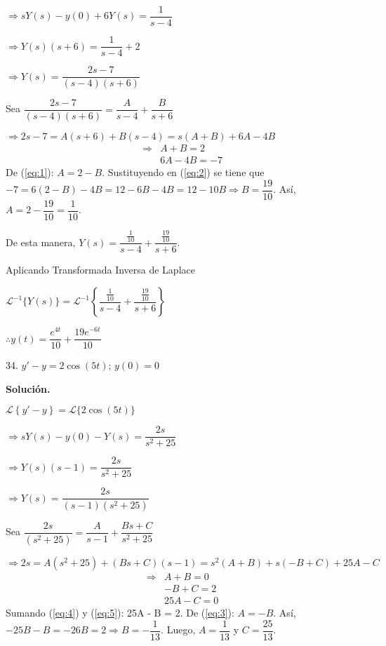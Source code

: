 \documentclass[fleqn]{article}
\begin{document}
    $ \Longrightarrow s Y(s) - y(0) + 6Y(s) = \dfrac{1}{s - 4} $

    $ \Longrightarrow Y(s)(s + 6) = \dfrac{1}{s - 4} + 2 $

    $ \Longrightarrow Y(s) = \dfrac{2s - 7}{(s - 4)(s + 6)} $

    Sea $ \dfrac{2s - 7}{(s - 4)(s + 6)} = \dfrac{A}{s - 4} + \dfrac{B}{s + 6} $

    $ \Longrightarrow 2s - 7 = A(s+6) + B(s-4) = s(A + B) + 6A - 4B $
    \begin{align}
        \Longrightarrow &A + B = 2 \label{eq:1} \\
        &6A - 4B = -7 \label{eq:2}
    \end{align}
    De (\ref{eq:1}): $ A = 2 - B $. Sustituyendo en (\ref{eq:2}) se tiene que $ -7 = 6(2 - B) - 4B = 12 - 6B - 4B = 12 - 10B \Longrightarrow B = \dfrac{19}{10} $. Así, $ A = 2 - \dfrac{19}{10} = \dfrac{1}{10} $.

    De esta manera, $ Y(s) = \dfrac{\frac{1}{10}}{s - 4} + \dfrac{\frac{19}{10}}{s + 6} $.

    Aplicando Transformada Inversa de Laplace

    $ \mathscr{L}^{-1} \lbrace Y(s) \rbrace = \mathscr{L}^{-1} \left\lbrace \dfrac{\frac{1}{10}}{s - 4} + \dfrac{\frac{19}{10}}{s + 6} \right\rbrace $ 

    $ \therefore y(t) = \dfrac{e^{4t}}{10} + \dfrac{19 e^{-6t}}{10} $

    34. $ y' - y = 2 \cos (5t) $; $ y(0) = 0 $
    
    \textbf{Solución.}

    $ \mathscr{L} \left\lbrace y' - y \right\rbrace = \mathscr{L} \lbrace 2 \cos (5t) \rbrace $

    $ \Longrightarrow s Y(s) - y(0) - Y(s) = \dfrac{2s}{s^2 + 25} $

    $ \Longrightarrow Y(s)(s - 1) = \dfrac{2s}{s^2 + 25} $

    $ \Longrightarrow Y(s) = \dfrac{2s}{(s - 1)(s^2 + 25)} $

    Sea $ \dfrac{2s}{(s^2 + 25)} = \dfrac{A}{s - 1} + \dfrac{Bs + C}{s^2 + 25} $

    $ \Longrightarrow 2s = A(s^2 + 25) + (Bs + C)(s - 1) = s^2(A + B) + s(-B + C) + 25A - C $
    \begin{align}
        \Longrightarrow &A + B = 0 \label{eq:3} \\
        & -B + C = 2 \label{eq:4} \\
        & 25A - C = 0 \label{eq:5}
    \end{align}
    Sumando (\ref{eq:4}) y (\ref{eq:5}): 25A - B = 2. De (\ref{eq:3}): $ A = -B $. Así, $ -25B - B = -26B = 2 \Longrightarrow B = - \dfrac{1}{13} $. Luego, $ A = \dfrac{1}{13} $ y $ C = \dfrac{25}{13} $.
\end{document}
